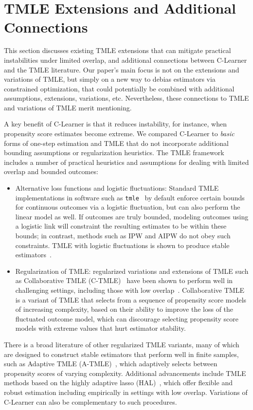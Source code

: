 \section{TMLE Extensions and Additional Connections}
\label{sec:tmle_comparison}

This section discusses existing TMLE extensions that can mitigate practical instabilities under limited overlap, and additional connections between C-Learner and the TMLE literature. Our paper's main focus is not on the extensions and variations of TMLE, but simply on a new way to debias estimators via constrained optimization, that could potentially be combined with additional assumptions, extensions, variations, etc. Nevertheless, these connections to TMLE and variations of TMLE merit mentioning. 


A key benefit of C-Learner is that it reduces instability, for instance, when propensity score estimates become extreme. We compared C-Learner to \emph{basic} forms of one-step estimation and TMLE that do not incorporate additional bounding assumptions or regularization heuristics. The TMLE framework includes a number of practical heuristics and assumptions for dealing with limited overlap and bounded outcomes:
\begin{itemize}
    \item Alternative loss functions and logistic fluctuations: Standard TMLE implementations in software such as \texttt{tmle}~\citep{gruber2012tmle} %
    by default enforce certain bounds for continuous outcomes via a logistic fluctuation, %
    but can also perform the linear model as well. If outcomes are truly bounded, modeling outcomes using a logistic link will constraint the resulting estimates to be within these bounds; in contrast, methods such as IPW and AIPW do not obey such constraints. TMLE with logistic fluctuations is shown to produce stable estimators~\citep{VanDerLaanRo11}. 
    \item Regularization of TMLE: regularized variations and extensions of TMLE such as Collaborative TMLE (C-TMLE)~\citep{gruber2010application,ju2019adaptive,van2010collaborative,van2011propensity} have been shown to perform well in challenging settings, including those with low overlap~\citep{ju2019collaborative,balzer2023two}. Collaborative TMLE is a variant of TMLE that selects from a sequence of propensity score models of increasing complexity, based on their ability to improve the loss of the fluctuated outcome model, which can discourage selecting propensity score models with extreme values that hurt estimator stability. 
\end{itemize}
There is a broad literature of other regularized TMLE variants, many of which are designed to construct stable estimators that perform well in finite samples, such as Adaptive TMLE (A-TMLE)~\citep{van2023adaptive,van2024adaptive}, which adaptively selects between propensity scores of varying complexity. Additional advancements include TMLE methods based on the highly adaptive lasso (HAL)~\citep{benkeser2016highly,bibaut2019fast,van2017generally,van2023efficient}, which offer flexible and robust estimation including empirically in settings with low overlap. 
Variations of C-Learner can also be complementary to such procedures. 




